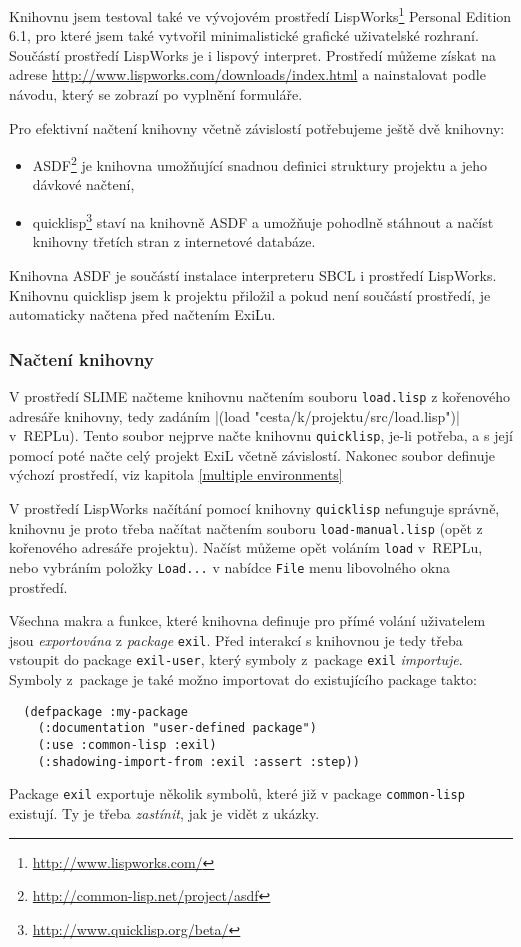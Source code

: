 Knihovnu jsem testoval také ve vývojovém prostředí
LispWorks\registered\footnote{\url{http://www.lispworks.com/}} Personal Edition
6.1, pro které jsem také vytvořil minimalistické grafické uživatelské rozhraní.
Součástí prostředí LispWorks je i lispový interpret. Prostředí můžeme získat na
adrese \url{http://www.lispworks.com/downloads/index.html} a nainstalovat podle
návodu, který se zobrazí po vyplnění formuláře.

Pro efektivní načtení knihovny včetně závislostí potřebujeme ještě dvě knihovny:
\clearpage
\begin{itemize}
  \item ASDF\footnote{\url{http://common-lisp.net/project/asdf}} je knihovna
    umožňující snadnou definici struktury projektu a jeho dávkové načtení,
  \item quicklisp\footnote{\url{http://www.quicklisp.org/beta/}} staví na knihovně
    ASDF a umožňuje pohodlně stáhnout a načíst knihovny třetích stran z internetové
    databáze.
\end{itemize}
Knihovna ASDF je součástí instalace interpreteru SBCL i prostředí LispWorks.
Knihovnu quicklisp jsem k projektu přiložil a pokud není součástí prostředí, je
automaticky načtena před načtením ExiLu.
\subsubsection{Načtení knihovny}
V prostředí SLIME načteme knihovnu načtením souboru \verb|load.lisp| z kořenového
adresáře knihovny, tedy zadáním \cl|(load "cesta/k/projektu/src/load.lisp")|
v~REPLu). Tento soubor nejprve načte knihovnu \verb|quicklisp|, je-li potřeba,
a s její pomocí poté načte celý projekt ExiL včetně závislostí. Nakonec soubor
definuje výchozí prostředí, viz kapitola \ref{multiple environments}

V prostředí LispWorks načítání pomocí knihovny \verb|quicklisp| nefunguje správně,
knihovnu je proto třeba načítat načtením souboru \verb|load-manual.lisp| (opět
z kořenového adresáře projektu). Načíst můžeme opět voláním \verb|load| v~REPLu,
nebo vybráním položky \verb|Load...| v nabídce \verb|File| menu libovolného okna
prostředí.

Všechna makra a funkce, které knihovna definuje pro přímé volání uživatelem jsou
\emph{exportována} z \emph{package} \verb|exil|. Před interakcí s knihovnou je
tedy třeba vstoupit do package \verb|exil-user|, který symboly z~package
\verb|exil| \emph{importuje}. Symboly z~package je také možno importovat do
existujícího package takto:
\begin{verbatim}
  (defpackage :my-package
    (:documentation "user-defined package")
    (:use :common-lisp :exil)
    (:shadowing-import-from :exil :assert :step))
\end{verbatim}
Package \verb|exil| exportuje několik symbolů, které již v package
\verb|common-lisp| existují. Ty je třeba \emph{zastínit}, jak je vidět z ukázky.
